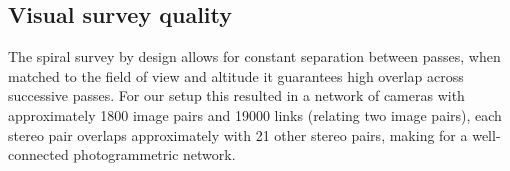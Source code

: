 \subsection{Visual survey quality}
The spiral survey by design allows for constant separation between passes, when matched to the field of view and altitude it guarantees high overlap across successive passes. For our setup this resulted in a network of cameras with approximately 1800 image pairs and 19000 links (relating two image pairs), each stereo pair overlaps approximately with 21 other stereo pairs, making for a well-connected photogrammetric network.


    
  
  